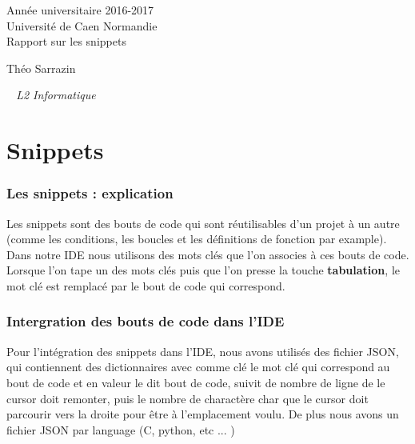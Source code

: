 \documentclass[a4paper,12pt]{article}
\begin{document}
\begin{titlepage}
	\begin{center}
		\Large{Année universitaire 2016-2017}\\
		\Large{Université de Caen Normandie}\\[1cm]
		
		\huge{Rapport sur les snippets}\\
		\vspace{3cm}
		
		Théo Sarrazin
		
	\normalsize{\textit{ ~ L2 Informatique}}\\
		\medskip
		\vspace{2cm}
				
	\end{center}
\end{titlepage}

\tableofcontents
\newpage

\section{Snippets}
	
	\subsubsection{Les snippets : explication}

		Les snippets sont des bouts de code qui sont réutilisables d'un projet à un autre (comme les conditions, les boucles et les définitions de fonction par example). Dans notre IDE nous utilisons des mots clés que l'on associes à ces bouts de code. Lorsque l'on tape un des mots clés puis que l'on presse la touche \textbf{tabulation}, le mot clé est remplacé par le bout de code qui correspond.

	\subsubsection{Intergration des bouts de code dans l'IDE}


			Pour l'intégration des snippets dans l'IDE, nous avons utilisés des fichier JSON, qui contiennent des dictionnaires avec comme clé le mot clé qui correspond au bout de code et en valeur le dit bout de code, suivit de nombre de ligne de le cursor doit remonter, puis le nombre de charactère char que le cursor doit parcourir vers la droite pour être à l'emplacement voulu. De plus nous avons un fichier JSON par language (C, python, etc ... )
\end{document}
